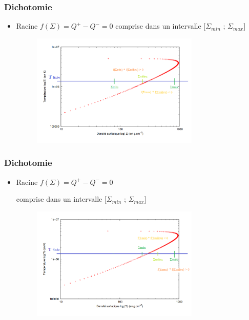 \documentclass[french]{beamer}
\begin{document}


   
    




\begin{frame}
\frametitle{Dichotomie}

   \begin{itemize}
      \item Racine $f(\Sigma) = Q^+ - Q^- = 0$ comprise dans un intervalle $[\Sigma_{min}$ ; $\Sigma_{max}]$
      \\
      \begin{figure}[htb!]
         \includegraphics[width=8cm]{figures/dicho_1.png}
      \end{figure}
   \end{itemize}
\end{frame}


\begin{frame}
\frametitle{Dichotomie}

   \begin{itemize}
      \item Racine $f(\Sigma) = Q^+ - Q^- = 0$ 
      
      comprise dans un intervalle $[\Sigma_{min}$ ; $\Sigma_{max}]$
      \\
      \begin{figure}[htb!]
         \includegraphics[width=8cm]{figures/dicho_2.png}
      \end{figure}
   \end{itemize}
\end{frame}
\end{document}
